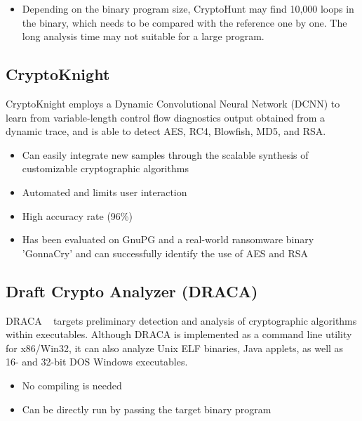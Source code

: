\begin{itemize}
  \item Depending on the binary program size, CryptoHunt may find 10,000 loops in the binary, which needs to be compared with the reference one by one. The long analysis time may not suitable for a large program.
\end{itemize}

\subsection{CryptoKnight}
 CryptoKnight \cite{hill2018cryptoknight} employs a Dynamic Convolutional Neural Network (DCNN)
to learn from variable-length control flow diagnostics output obtained from a dynamic trace, and
is able to detect AES, RC4, Blowfish, MD5, and RSA.

\begin{itemize}
  \item Can easily integrate new samples through the scalable synthesis of customizable cryptographic algorithms
  \item Automated and limits user interaction
  \item High accuracy rate (96\%)
\end{itemize}

\begin{itemize}
  \item Has been evaluated on GnuPG and a real-world ransomware binary 'GonnaCry' and can successfully identify the use of AES and RSA
\end{itemize}

\subsection{Draft Crypto Analyzer (DRACA)}
 DRACA ~\cite{draca} targets preliminary detection and analysis of cryptographic algorithms within executables.
Although DRACA is implemented as a command line utility for x86/Win32, it can also analyze Unix ELF binaries,
Java applets, as well as 16- and 32-bit DOS Windows executables.

\begin{itemize}
  \item No compiling is needed
  \item Can be directly run by passing the target binary program
\end{itemize}

